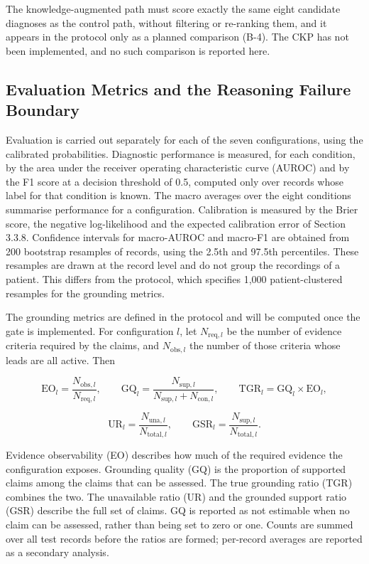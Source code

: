 The knowledge-augmented path must score exactly the same eight candidate diagnoses as the control path, without filtering or re-ranking them, and it appears in the protocol only as a planned comparison (B-4). The CKP has not been implemented, and no such comparison is reported here.

\subsection{Evaluation Metrics and the Reasoning Failure Boundary}
Evaluation is carried out separately for each of the seven configurations, using the calibrated probabilities. Diagnostic performance is measured, for each condition, by the area under the receiver operating characteristic curve (AUROC) and by the F1 score at a decision threshold of 0.5, computed only over records whose label for that condition is known. The macro averages over the eight conditions summarise performance for a configuration. Calibration is measured by the Brier score, the negative log-likelihood and the expected calibration error of Section 3.3.8. Confidence intervals for macro-AUROC and macro-F1 are obtained from 200 bootstrap resamples of records, using the 2.5th and 97.5th percentiles. These resamples are drawn at the record level and do not group the recordings of a patient. This differs from the protocol, which specifies 1,000 patient-clustered resamples for the grounding metrics.

The grounding metrics are defined in the protocol and will be computed once the gate is implemented. For configuration $l$, let $N_{\text{req},l}$ be the number of evidence criteria required by the claims, and $N_{\text{obs},l}$ the number of those criteria whose leads are all active. Then

\[
\text{EO}_l = \frac{N_{\text{obs},l}}{N_{\text{req},l}}, \qquad \text{GQ}_l = \frac{N_{\text{sup},l}}{N_{\text{sup},l} + N_{\text{con},l}}, \qquad \text{TGR}_l = \text{GQ}_l \times \text{EO}_l,
\]

\[
\text{UR}_l = \frac{N_{\text{una},l}}{N_{\text{total},l}}, \qquad \text{GSR}_l = \frac{N_{\text{sup},l}}{N_{\text{total},l}}.
\]

Evidence observability (EO) describes how much of the required evidence the configuration exposes. Grounding quality (GQ) is the proportion of supported claims among the claims that can be assessed. The true grounding ratio (TGR) combines the two. The unavailable ratio (UR) and the grounded support ratio (GSR) describe the full set of claims. GQ is reported as not estimable when no claim can be assessed, rather than being set to zero or one. Counts are summed over all test records before the ratios are formed; per-record averages are reported as a secondary analysis.

